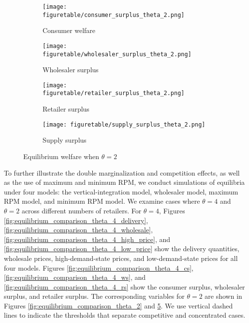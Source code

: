 \documentclass[12pt]{article}
\begin{document}
\begin{figure}[tbp]
	\begin{subfigure}{0.5\textwidth}
		\centering
		\texttt{[image: figuretable/consumer\_surplus\_theta\_2.png]}  
		\caption{Consumer welfare}
		\label{fig:equilibrium_comparison_theta_2_cs}
	\end{subfigure}
	\begin{subfigure}{0.5\textwidth}
	\centering
		\texttt{[image: figuretable/wholesaler\_surplus\_theta\_2.png]} 
		\caption{Wholesaler surplus}
		\label{fig:equilibrium_comparison_theta_2_ws}
	\end{subfigure}
	\newline
	\begin{subfigure}{0.5\textwidth}
		\centering
		\texttt{[image: figuretable/retailer\_surplus\_theta\_2.png]} 
		\caption{Retailer surplus}
		\label{fig:equilibrium_comparison_theta_2_rs}
	\end{subfigure}
	\begin{subfigure}{0.5\textwidth}
		\centering
		\texttt{[image: figuretable/supply\_surplus\_theta\_2.png]} 
		\caption{Supply surplus}
		\label{fig:equilibrium_comparison_theta_2_ss}
	\end{subfigure}
	\caption{Equilibrium welfare when $\theta = 2$}
	\label{fig:welfare_comparision_theta_2}
	\footnotesize
\end{figure}

To further illustrate the double marginalization and competition effects, as well as the use of maximum and minimum RPM, we conduct simulations of equilibria under four models: the vertical-integration model, wholesaler model, maximum RPM model, and minimum RPM model. We examine cases where $\theta = 4$ and $\theta = 2$ across different numbers of retailers. For $\theta = 4$, Figures \ref{fig:equilibrium_comparison_theta_4_delivery}, \ref{fig:equilibrium_comparison_theta_4_wholesale}, \ref{fig:equilibrium_comparison_theta_4_high_price}, and \ref{fig:equilibrium_comparison_theta_4_low_price} show the delivery quantities, wholesale prices, high-demand-state prices, and low-demand-state prices for all four models. Figures \ref{fig:equilibrium_comparison_theta_4_cs}, \ref{fig:equilibrium_comparison_theta_4_ws}, and \ref{fig:equilibrium_comparison_theta_4_rs} show the consumer surplus, wholesaler surplus, and retailer surplus. The corresponding variables for $\theta = 2$ are shown in Figures \ref{fig:equilibrium_comparison_theta_2} and \ref{fig:welfare_comparision_theta_2}. We use vertical dashed lines to indicate the thresholds that separate competitive and concentrated cases.
\end{document}
